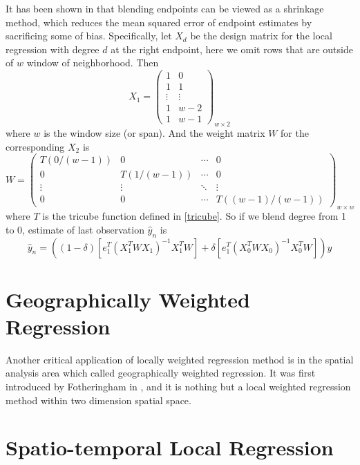 It has been shown in \cite{hafen2010local} that blending endpoints can be viewed
as a shrinkage method, which reduces the mean squared error of endpoint estimates
by sacrificing some of bias. Specifically, let $X_d$ be the design matrix for the
local regression with degree $d$ at the right endpoint, here we omit rows that
are outside of $w$ window of neighborhood. Then
\begin{equation}
X_1 =  
\begin{pmatrix}
  1 & 0  \\
  1 & 1  \\
  \vdots &  \vdots  \\
  1 & w-2 \\
  1 & w-1 
\end{pmatrix}
_{w \times 2}
\end{equation}
where $w$ is the window size (or span). And the weight matrix $W$ for the 
corresponding $X_2$ is
\begin{equation}
W =  
\begin{pmatrix}
  T(0/(w-1)) & 0 & \cdots & 0 \\
  0 & T(1/(w-1)) & \cdots & 0 \\
  \vdots  & \vdots & \ddots & \vdots  \\
  0 & 0 & \cdots & T((w-1)/(w-1)) 
\end{pmatrix}
_{w \times w}
\end{equation}
where $T$ is the tricube function defined in \ref{tricube}. So if we blend degree
from 1 to 0, estimate of last observation $\hat y_n$ is
\begin{equation}
\hat y_n = ((1-\delta)[e_1^{T}(X_1^{T}WX_1)^{-1}X_1^{T}W] + \delta[e_1^{T}(X_0^{T}WX_0)^{-1}X_0^{T}W])y
\end{equation}

\section{Geographically Weighted Regression}

Another critical application of locally weighted regression method is in the 
spatial analysis area which called geographically weighted regression. It was first
introduced by Fotheringham in \cite{fotheringhamgeographically}, and it is nothing
but a local weighted regression method within two dimension spatial space.

\section{Spatio-temporal Local Regression}

